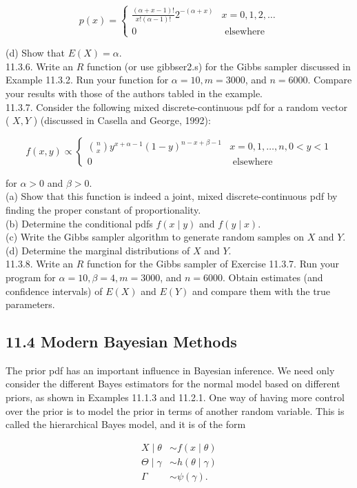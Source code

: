 $$
p(x)= \begin{cases}\frac{(\alpha+x-1)!}{x!(\alpha-1)!} 2^{-(\alpha+x)} & x=0,1,2, \ldots \\ 0 & \text { elsewhere }\end{cases}
$$

(d) Show that $E(X)=\alpha$.\\
11.3.6. Write an $R$ function (or use gibbser2.s) for the Gibbs sampler discussed in Example 11.3.2. Run your function for $\alpha=10, m=3000$, and $n=6000$. Compare your results with those of the authors tabled in the example.\\
11.3.7. Consider the following mixed discrete-continuous pdf for a random vector ( $X, Y$ ) (discussed in Casella and George, 1992):

$$
f(x, y) \propto \begin{cases}\binom{n}{x} y^{x+\alpha-1}(1-y)^{n-x+\beta-1} & x=0,1, \ldots, n, 0<y<1 \\ 0 & \text { elsewhere }\end{cases}
$$

for $\alpha>0$ and $\beta>0$.\\
(a) Show that this function is indeed a joint, mixed discrete-continuous pdf by finding the proper constant of proportionality.\\
(b) Determine the conditional pdfs $f(x \mid y)$ and $f(y \mid x)$.\\
(c) Write the Gibbs sampler algorithm to generate random samples on $X$ and $Y$.\\
(d) Determine the marginal distributions of $X$ and $Y$.\\
11.3.8. Write an $R$ function for the Gibbs sampler of Exercise 11.3.7. Run your program for $\alpha=10, \beta=4, m=3000$, and $n=6000$. Obtain estimates (and confidence intervals) of $E(X)$ and $E(Y)$ and compare them with the true parameters.

\subsection*{11.4 Modern Bayesian Methods}
The prior pdf has an important influence in Bayesian inference. We need only consider the different Bayes estimators for the normal model based on different priors, as shown in Examples 11.1.3 and 11.2.1. One way of having more control over the prior is to model the prior in terms of another random variable. This is called the hierarchical Bayes model, and it is of the form


\begin{align*}
X \mid \theta & \sim f(x \mid \theta) \\
\Theta \mid \gamma & \sim h(\theta \mid \gamma) \\
\Gamma & \sim \psi(\gamma) . \tag{11.4.1}
\end{align*}


